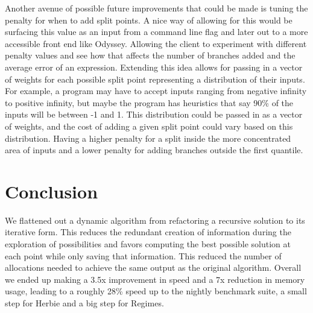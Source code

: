 \documentclass{article}
\begin{document}
Another avenue of possible future improvements that could be made is tuning the penalty for when to add split points. A nice way of allowing for this would be surfacing this value as an input from a command line flag and later out to a more accessible front end like Odyssey. Allowing the client to experiment with different penalty values and see how that affects the number of branches added and the average error of an expression. Extending this idea allows for passing in a vector of weights for each possible split point representing a distribution of their inputs. For example, a program may have to accept inputs ranging from negative infinity to positive infinity, but maybe the program has heuristics that say 90\% of the inputs will be between -1 and 1. This distribution could be passed in as a vector of weights, and the cost of adding a given split point could vary based on this distribution. Having a higher penalty for a split inside the more concentrated area of inputs and a lower penalty for adding branches outside the first quantile. 


\section{Conclusion}

We flattened out a dynamic algorithm from refactoring a recursive solution to its iterative form. This reduces the redundant creation of information during the exploration of possibilities and favors computing the best possible solution at each point while only saving that information. This reduced the number of allocations needed to achieve the same output as the original algorithm. Overall we ended up making a 3.5x improvement in speed and a 7x reduction in memory usage, leading to a roughly 28\% speed up to the nightly benchmark suite, a small step for Herbie and a big step for Regimes.

\newpage


\newpage
\appendix
\lstset{style=racket-source-code}
\end{document}
